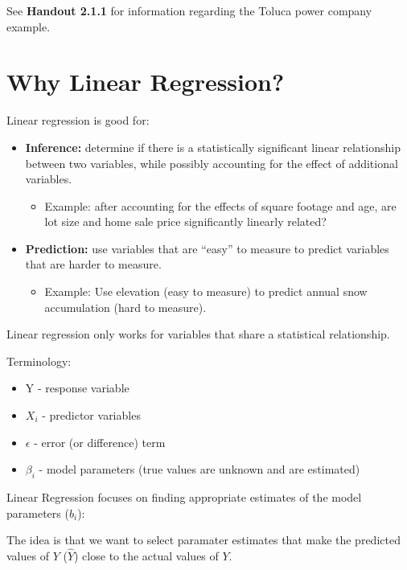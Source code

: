 \documentclass[12pt]{notes}
\begin{document}

See \textbf{Handout 2.1.1} for information regarding the Toluca power company example.

\section{Why Linear Regression?}

\nspace
Linear regression is good for: 
\begin{itemize}
\item \textbf{Inference:} determine if there is a statistically significant linear relationship between two variables, while possibly accounting for the effect of additional variables. 
\begin{itemize}
\item Example: after accounting for the effects of square footage and age, are lot size and home sale price significantly linearly related?  
\end{itemize} 
\item \textbf{Prediction:} use variables that are ``easy'' to measure to predict variables that are harder to measure.  
\begin{itemize}
\item Example: Use elevation (easy to measure) to predict annual snow accumulation (hard to measure). 
\end{itemize} 
\end{itemize}

\nspace
Linear regression only works for variables that share a statistical relationship.

\nspace
Terminology: 

\begin{itemize}
\item Y - response variable
\item $X_i$ - predictor variables
\item $\epsilon$ - error (or difference) term
\item $\beta_i$ - model parameters (true values are unknown and are estimated)
\end{itemize}

\nspace
Linear Regression focuses on finding appropriate estimates of the model parameters ($b_i$):

\nspace
The idea is that we want to select paramater estimates that make the predicted values of $Y$ ($\hat{Y}$) close to the actual values of $Y$.
\end{document}
